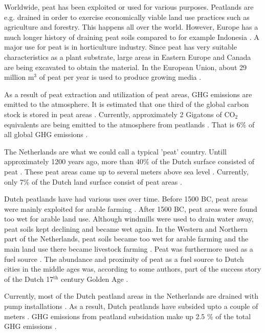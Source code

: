 \documentclass[a4paper,12pt]{scrbook}
\newcommand{\sur}[1]{\ensuremath{^{\textrm{#1}}}}
\newcommand{\sous}[1]{\ensuremath{_{\textrm{#1}}}}
\begin{document}
Worldwide, peat has been exploited or used for various purposes. Peatlands are e.g. drained in order to exercise economically viable land use practices such as agriculture and forestry. This happens all over the world. However, Europe has a much longer history of draining peat soils compared to for example Indonesia \citep{joosten2002wise}. A major use for peat is in horticulture industry. Since peat has very suitable characteristics as a plant substrate, large areas in Eastern Europe and Canada are being excavated to obtain the material. In the European Union, about 29 million m\sur{3} of peat per year is used to produce growing media \citep{blievernicht2012youngest}.

As a result of peat extraction and utilization of peat areas, \ac{GHG} emissions are emitted to the atmosphere. It is estimated that one third of the global carbon stock is stored in peat areas \citep{page2011global}. Currently, approximately 2 Gigatons of CO\sous{2} equivalents are being emitted to the atmosphere from peatlands \citep{joosten2009global}. That is 6\% of all global \ac{GHG} emissions \citep{joosten2012peatlands}.

The Netherlands are what we could call a typical 'peat' country. Untill approximately 1200 years ago, more than 40\% of the Dutch surface consisted of peat \citep{vos2015origin, de2008vergeten}. These peat areas came up to several meters above sea level \citep{de2008vergeten}. Currently, only 7\% of the Dutch land surface consist of peat areas \citep{de2004verbreiding}. 

Dutch peatlands have had various uses over time. Before 1500 BC, peat areas were mainly exploited for arable farming \citep{ettema2005boeren}. After 1500 BC, peat areas were found too wet for arable land use. Although windmills were used to drain water away, peat soils kept declining and became wet again. In the Western and Northern part of the Netherlands, peat soils became too wet for arable farming and the main land use there became livestock farming \citep{brouns2016effects}. Peat was furthermore used as a fuel source \citep{van1996turfwinning}. The abundance and proximity of peat as a fuel source to Dutch cities in the middle ages was, according to some authors, part of the success story of the Dutch 17\sur{th} century Golden Age \citep{de1978peat}.

Currently, most of the Dutch peatland areas in the Netherlands are drained with pump installations \citep{brouns2016effects}. As a result, Dutch peatlands have subsided upto a couple of meters \citep{de2008vergeten}. \ac{GHG} emissions from peatland subsidation make up 2.5 \% of the total GHG emissions \citep{van2010emission}. 
\end{document}

